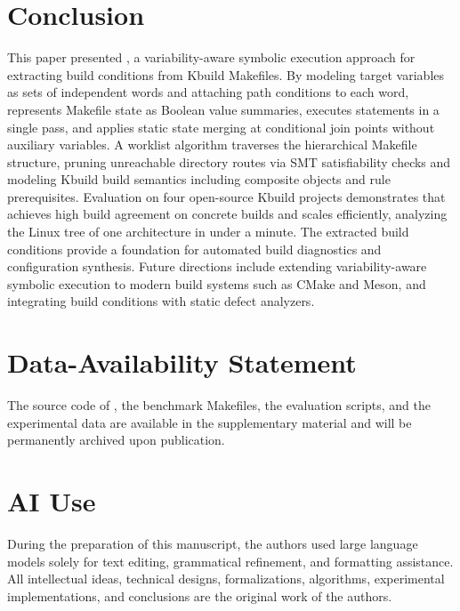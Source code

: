 \documentclass[acmsmall,screen,review,anonymous,nonacm]{acmart}
\begin{document}
\section{Conclusion}
  \label{sec:conclusion}
  This paper presented \tool{}, a variability-aware symbolic execution approach for extracting build conditions from Kbuild Makefiles.
  By modeling target variables as sets of independent words and attaching path conditions to each word, \tool{} represents Makefile state as Boolean value summaries, executes statements in a single pass, and applies static state merging at conditional join points without auxiliary variables.
  A worklist algorithm traverses the hierarchical Makefile structure, pruning unreachable directory routes via SMT satisfiability checks and modeling Kbuild build semantics including composite objects and rule prerequisites.
  Evaluation on four open-source Kbuild projects demonstrates that \tool{} achieves high build agreement on concrete builds and scales efficiently, analyzing the Linux tree of one architecture in under a minute.
  The extracted build conditions provide a foundation for automated build diagnostics and configuration synthesis.
  Future directions include extending variability-aware symbolic execution to modern build systems such as CMake and Meson, and integrating build conditions with static defect analyzers.

\section*{Data-Availability Statement}
The source code of \tool{}, the benchmark Makefiles, the evaluation scripts, and the experimental data are available in the supplementary material and will be permanently archived upon publication.

\section*{AI Use}
During the preparation of this manuscript, the authors used large language models solely for text editing, grammatical refinement, and formatting assistance.
All intellectual ideas, technical designs, formalizations, algorithms, experimental implementations, and conclusions are the original work of the authors.



\end{document}
